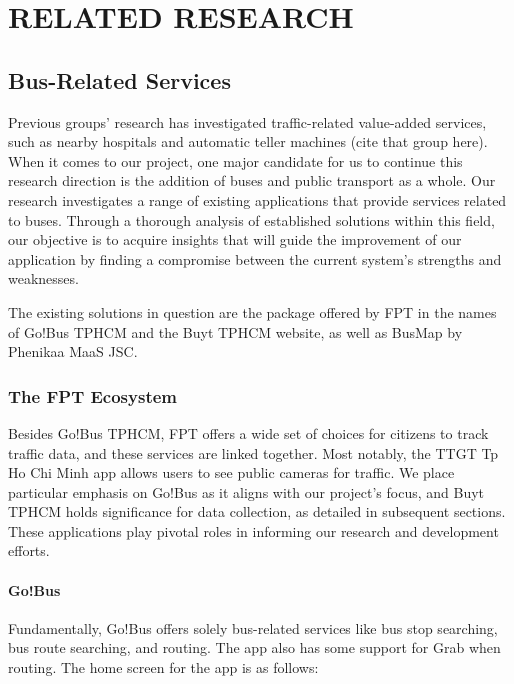 %
%
\section{RELATED RESEARCH}

\subsection{Bus-Related Services}

Previous groups' research has investigated traffic-related value-added services, such as nearby hospitals and automatic teller machines (cite that group here). When it comes to our project, one major candidate for us to continue this research direction is the addition of buses and public transport as a whole. Our research investigates a range of existing applications that provide services related to buses. Through a thorough analysis of established solutions within this field, our objective is to acquire insights that will guide the improvement of our application by finding a compromise between the current system's strengths and weaknesses.

The existing solutions in question are the package offered by FPT in the names of Go!Bus TPHCM and the Buyt TPHCM website, as well as BusMap by Phenikaa MaaS JSC.
\subsubsection{The FPT Ecosystem}

Besides Go!Bus TPHCM, FPT offers a wide set of choices for citizens to track traﬀic data, and these services are linked together. Most notably, the TTGT Tp Ho Chi Minh app allows users to see public cameras for traﬀic. We place particular emphasis on Go!Bus as it aligns with our project's focus, and Buyt TPHCM holds significance for data collection, as detailed in subsequent sections. These applications play pivotal roles in informing our research and development efforts.

\paragraph{Go!Bus}

Fundamentally, Go!Bus offers solely bus-related services like bus stop searching, bus route searching, and routing. The app also has some support for Grab when routing. The home screen for the app is as follows:


